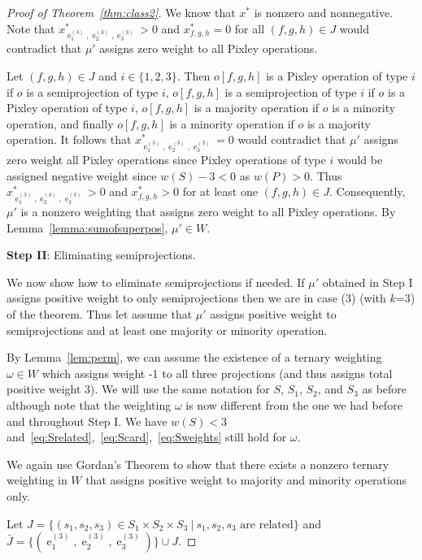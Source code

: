 \documentclass[11pt, reqno]{article}
\DeclareMathOperator{\proj}{\ensuremath{e}}
\theoremstyle{remark}
\begin{document}
\begin{proof}[Proof of Theorem~\ref{thm:class2}]
  We know that $x^*$ is nonzero and nonnegative. Note that
  $x^*_{\proj^{(3)}_1,\proj^{(3)}_2,\proj^{(3)}_3}>0$ and $x^*_{f,g,h}=0$ for
  all $(f,g,h)\in J$ would contradict that $\mu'$ assigns zero weight to all
  Pixley operations. 

  Let
  $(f,g,h)\in J$ and $i\in\{1,2,3\}$. Then $o[f,g,h]$ is a Pixley operation of
  type $i$ if $o$ is a semiprojection of type $i$, $o[f,g,h]$ is a
  semiprojection of type $i$ if $o$ is a Pixley operation of type $i$,
  $o[f,g,h]$ is a majority operation if $o$ is a minority operation, and finally
  $o[f,g,h]$ is a minority operation if $o$ is a majority operation. 
  It follows that $x^*_{\proj^{(3)}_1,\proj^{(3)}_2,\proj^{(3)}_3}=0$ would
  contradict that $\mu'$ assigns zero weight all Pixley operations since Pixley
  operations of type $i$ would be assigned negative weight since $w(S)-3<0$ as
  $w(P)>0$. Thus $x^*_{\proj^{(3)}_1,\proj^{(3)}_2,\proj^{(3)}_3}>0$ and
  $x^*_{f,g,h}>0$ for at least one $(f,g,h)\in J$. Consequently, $\mu'$ is a
  nonzero weighting that assigns zero weight to all Pixley operations. By
  Lemma~\ref{lemma:sumofsuperpos}, $\mu'\in W$.

  
  \textbf{Step II}: Eliminating semiprojections.

  We now show how to eliminate semiprojections if needed. If $\mu'$ obtained in
  Step I assigns positive weight to only semiprojections then we are in case
  (3) (with $k$=3) of the theorem.  Thus let assume that $\mu'$ assigns positive
  weight to semiprojections and at least one majority or minority operation. 
  
  By Lemma~\ref{lem:perm}, we can
  assume the existence of a ternary weighting $\omega\in W$ which assigns weight -1 to all three projections (and thus
  assigns total positive weight 3). We will use the same notation for $S$,
  $S_1$, $S_2$, and $S_3$ as before although note that the weighting $\omega$ is
  now different from the one we had before and throughout Step I.
  We have $w(S)<3$
  and~\eqref{eq:Srelated},~\eqref{eq:Scard},~\eqref{eq:Sweights} still hold for
  $\omega$. 

  We again use Gordan's Theorem to show that there exists a nonzero ternary
  weighting in $W$ that assigns positive weight to majority and minority
  operations only. 

  Let $J=\{(s_1,s_2,s_3)\in S_1\times S_2\times S_3\:|\:\mbox{$s_1, s_2, s_3$ are related}\}$
  and $\bar{J}=\{(\proj^{(3)}_1,\proj^{(3)}_2,\proj^{(3)}_3)\}\cup J$.


\end{proof}
\end{document}
